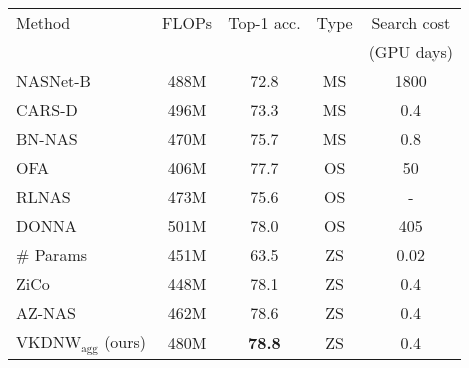 \begin{table}
  \centering
  \small
  \begin{tabular}{@{}lcccc@{}}
    \toprule
    Method & FLOPs & Top-1 acc. & Type & Search cost \\
    &&&& (GPU days) \\
    \midrule
NASNet-B~\cite{zoph2018learning} & 488M & 72.8 & MS & 1800 \\
CARS-D~\cite{yang2020cars}  & 496M & 73.3 & MS & 0.4 \\
BN-NAS~\cite{chen2021bn}  & 470M & 75.7 & MS & 0.8 \\
OFA~\cite{cai2019once}  & 406M & 77.7 & OS & 50 \\
RLNAS~\cite{zhang2021neural}  & 473M & 75.6 & OS & - \\
DONNA~\cite{moons2021distilling}  & 501M & 78.0 & OS & 405 \\
\# Params & 451M & 63.5 & ZS & 0.02 \\
ZiCo~\cite{li2023zico}  & 448M & 78.1 & ZS & 0.4 \\
AZ-NAS~\cite{lee2024az} & 462M & 78.6 & ZS & 0.4 \\
$\text{VKDNW}_{\text{agg}}$ (ours) & 480M & \textbf{78.8} & ZS & 0.4 \\


\end{tabular}
\end{table}
